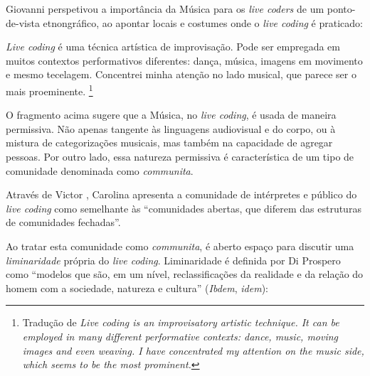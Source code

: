 Giovanni  perspetivou a importância da Música para os \emph{live coders} de um ponto-de-vista etnongráfico, ao apontar locais e costumes onde o \emph{live coding} é praticado:

\begin{citacao}
\emph{Live coding} é uma técnica artística de improvisação. Pode ser empregada em muitos contextos performativos diferentes: dança, música, imagens em movimento e mesmo tecelagem. Concentrei minha atenção no lado musical, que parece ser o mais proeminente. \cite[p.~117]{mori_analysing_2015}\footnote{Tradução de \emph{Live coding is an improvisatory artistic technique. It can be employed in many different performative contexts: dance, music, moving images and even weaving. I have concentrated my attention on the music side, which seems to be the most prominent.}}
\end{citacao}

O fragmento acima sugere que a Música, no \emph{live coding}, é usada de maneira permissiva. Não apenas tangente às linguagens audiovisual e do corpo, ou à mistura de categorizações musicais,  mas também na capacidade de agregar pessoas. Por outro lado, essa natureza permissiva é característica de um tipo de comunidade denominada como \emph{communita}.

Através de Victor , Carolina  apresenta a comunidade de intérpretes e público do \emph{live coding} como semelhante às ``comunidades abertas, que diferem das estruturas de comunidades fechadas''.

Ao tratar esta comunidade como \emph{communita}, é aberto espaço para discutir uma \emph{liminaridade} própria do \emph{live coding}. Liminaridade é definida por Di Prospero como ``modelos que são, em um nível, reclassificações da realidade e da relação do homem com a sociedade, natureza e cultura'' (\emph{Ibdem}, \emph{idem}):

